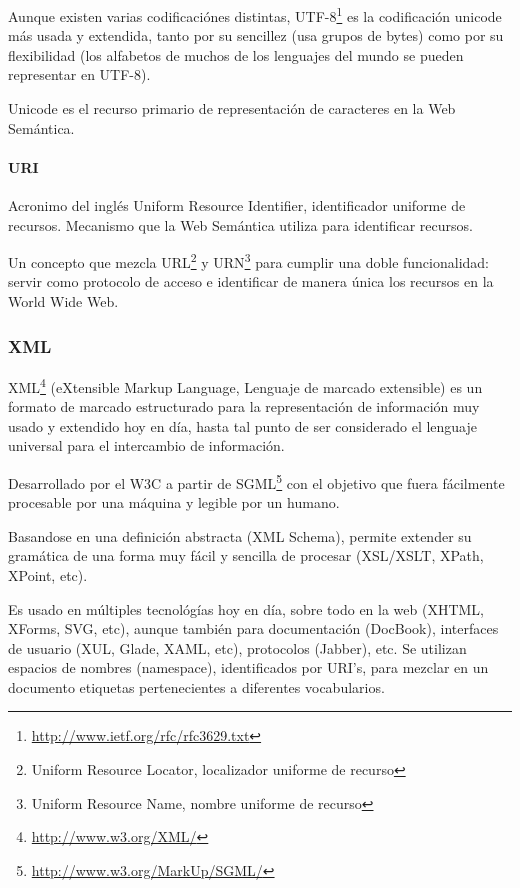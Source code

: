Aunque existen varias codificaciónes distintas, 
UTF-8\footnote{\url{http://www.ietf.org/rfc/rfc3629.txt}} es la codificación 
unicode más usada y extendida, tanto por su sencillez (usa grupos de bytes) 
como por su flexibilidad (los alfabetos de muchos de los lenguajes del mundo 
se pueden representar en UTF-8).

Unicode es el recurso primario de representación de caracteres en la Web Semántica.

\paragraph{URI}

Acronimo del inglés Uniform Resource Identifier, identificador uniforme de recursos.
Mecanismo que la Web Semántica utiliza para identificar recursos. 

Un concepto que mezcla URL\footnote{Uniform Resource Locator, localizador uniforme de recurso} 
y URN\footnote{Uniform Resource Name, nombre uniforme de recurso} para cumplir una doble 
funcionalidad: servir como protocolo de acceso e identificar de manera única los recursos 
en la World Wide Web.

\subsubsection{XML}

XML\footnote{\url{http://www.w3.org/XML/}} (eXtensible Markup Language, Lenguaje 
de marcado extensible) es un formato de marcado estructurado para la representación 
de información muy usado y extendido hoy en día, hasta tal punto de ser considerado 
el lenguaje universal para el intercambio de información. 

Desarrollado por el W3C a partir de SGML\footnote{\url{http://www.w3.org/MarkUp/SGML/}} 
con el objetivo que fuera fácilmente procesable por una máquina y legible por un 
humano. 

Basandose en una definición abstracta (XML Schema), permite extender su gramática 
de una forma muy fácil y sencilla de procesar (XSL/XSLT, XPath, XPoint, etc).

Es usado en múltiples tecnológías hoy en día, sobre todo en la web (XHTML, XForms, 
SVG, etc), aunque también para documentación (DocBook), interfaces de usuario (XUL,
Glade, XAML, etc), protocolos (Jabber), etc. Se utilizan espacios de nombres (namespace), 
identificados por URI's, para mezclar en un documento etiquetas pertenecientes a 
diferentes vocabularios.

